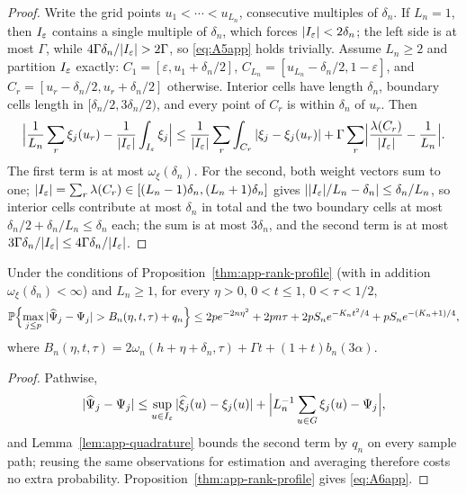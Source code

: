 \begin{proof}
Write the grid points $u_1<\cdots<u_{L_n}$, consecutive multiples of
$\delta_n$.  If $L_n=1$, then $I_\varepsilon$ contains a single multiple of
$\delta_n$, which forces $|I_\varepsilon|<2\delta_n$; the left side is at most
$\Gamma$, while $4\Gamma\delta_n/|\I|>2\Gamma$, so \eqref{eq:A5app}
holds trivially.  Assume $L_n\ge2$ and partition $I_\varepsilon$
exactly: $C_1=[\varepsilon,u_1+\delta_n/2]$,
$C_{L_n}=[u_{L_n}-\delta_n/2,1-\varepsilon]$, and
$C_r=[u_r-\delta_n/2,u_r+\delta_n/2]$ otherwise.  Interior cells have
length $\delta_n$, boundary cells length in $[\delta_n/2,3\delta_n/2)$,
and every point of $C_r$ is within $\delta_n$ of $u_r$.  Then
\[
 \Bigl|\frac1{L_n}\sum_r\xi_j(u_r)-\frac1{|I_\varepsilon|}\int_{I_\varepsilon}\xi_j\Bigr|
 \le\frac1{|I_\varepsilon|}\sum_r\int_{C_r}|\xi_j-\xi_j(u_r)|
 +\Gamma\sum_r\Bigl|\frac{\lambda(C_r)}{|I_\varepsilon|}-\frac1{L_n}\Bigr|.
\]
The first term is at most $\omega_\xi(\delta_n)$.  For the second, both
weight vectors sum to one;
$|I_\varepsilon|=\sum_r\lambda(C_r)\in[(L_n-1)\delta_n,(L_n+1)\delta_n]$ gives
$||I_\varepsilon|/L_n-\delta_n|\le\delta_n/L_n$, so interior cells contribute at most
$\delta_n$ in total and the two boundary cells at most
$\delta_n/2+\delta_n/L_n\le\delta_n$ each; the sum is at most $3\delta_n$,
and the second term is at most $3\Gamma\delta_n/|I_\varepsilon|\le
4\Gamma\delta_n/|I_\varepsilon|$.
\end{proof}

\begin{proposition}\label{thm:app-score}
Under the conditions of Proposition~\ref{thm:app-rank-profile} (with in
addition $\omega_\xi(\delta_n)<\infty$) and $L_n\ge1$, for every
$\eta>0$, $0<t\le1$, $0<\tau<1/2$,
\begin{align}
 \mathbb P\Bigl\{\max_{j\le p}|\widehat\Psi_j-\Psi_j|
 >B_n(\eta,t,\tau)+q_n\Bigr\}
 \le
 2pe^{-2n\eta^2}+2pn\tau+2pS_ne^{-K_nt^2/4}+pS_ne^{-(K_n+1)/4},
 \label{eq:A6app}
\end{align}
where
$B_n(\eta,t,\tau)=2\omega_n(h+\eta+\delta_n,\tau)+\Gamma t
+(1+t)b_n(3\alpha)$.
\end{proposition}

\begin{proof}
Pathwise,
\[
 |\widehat\Psi_j-\Psi_j|
 \le\sup_{u\in I_\varepsilon}|\widehat\xi_j(u)-\xi_j(u)|
 +\Bigl|L_n^{-1}\sum_{u\in G}\xi_j(u)-\Psi_j\Bigr|,
\]
and Lemma~\ref{lem:app-quadrature} bounds the second term by $q_n$ on
every sample path; reusing the same observations for estimation and
averaging therefore costs no extra probability.
Proposition~\ref{thm:app-rank-profile} gives \eqref{eq:A6app}.
\end{proof}


